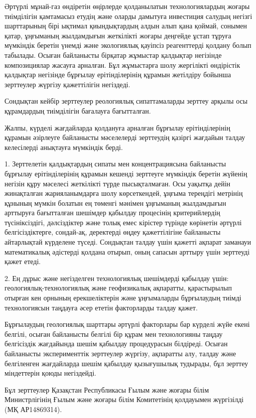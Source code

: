 \begin{multicols}{2}
Әртүрлі мұнай-газ өндіретін өңірлерде қолданылатын технологиялардың
жоғары тиімділігін қамтамасыз етудің және оларды дамытуға инвестиция
салудың негізгі шарттарының бірі ықтимал қиындықтардың алдын алып қана
қоймай, сонымен қатар, ұңғыманың жылдамдығын жеткілікті жоғары деңгейде
ұстап тұруға мүмкіндік беретін үнемді және экологиялық қауіпсіз
реагенттерді қолдану болып табылады. Осыған байланысты бірқатар жұмыстар
қалдықтар негізінде композициялар жасауға арналған. Бұл жұмыстарға шолу
жергілікті өндірістік қалдықтар негізінде бұрғылау ерітінділерінің
құрамын жетілдіру бойынша зерттеулер жүргізу қажеттілігін негіздеді.

Сондықтан кейбір зерттеулер реологиялық сипаттамаларды зерттеу арқылы
осы құрамдардың тиімділігін бағалауға бағытталған.

Жалпы, күрделі жағдайларда қолдануға арналған бұрғылау ерітінділерінің
құрамын әзірлеуге байланысты мәселелерді зерттеудің қазіргі жағдайын
талдау келесілерді анықтауға мүмкіндік берді.

1. Зерттелетін қалдықтардың сипаты мен концентрациясына байланысты
бұрғылау ерітінділерінің құрамын кешенді зерттеуге мүмкіндік беретін
жүйенің негізін құру мәселесі жеткілікті түрде пысықталмаған. Осы
уақытқа дейін жинақталған жарияланымдарға шолу көрсеткендей, ұңғыма
тереңдігі метрінің құнының мүмкін болатын ең төменгі мәнімен ұңғыманың
жылдамдығын арттыруға бағытталған шешімдер қабылдау процесінің
критерийлердің түсініксіздігі, дәлсіздіктер және толық емес кірістер
түрінде көрінетін әртүрлі белгісіздіктерге, сондай-ақ, деректерді өңдеу
қажеттілігіне байланысты айтарлықтай күрделене түседі. Сондықтан талдау
үшін қажетті ақпарат заманауи математикалық әдістерді қолдана отырып,
оның сапасын арттыру үшін зерттеуді қажет етеді.

2. Ең дұрыс және негізделген технологиялық шешімдерді қабылдау үшін:
геологиялық-технологиялық және геофизикалық ақпаратты, қарастырылып
отырған кен орнының ерекшеліктерін және ұңғымаларды бұрғылаудың тиімді
технологиясын таңдауға әсер ететін факторларды талдау қажет.

Бұрғылаудың геологиялық шарттары әртүрлі факторлары бар күрделі жүйе
екені белгілі, осыған байланысты белгілі бір құрам мен технологияны
таңдау белгісіздік жағдайында шешім қабылдау процедурасын білдіреді.
Осыған байланысты эксперименттік зерттеулер жүргізу, ақпаратты алу,
талдау және белгіленген жағдайларда шешім қабылдау қызығушылық тудырады,
бұл зерттеу міндеттерін қоюды негіздейді.

Бұл зерттеулер Қазақстан Республикасы Ғылым және жоғары білім
Министрлігінің Ғылым және жоғары білім Комитетінің қолдауымен жүргізілді
(МҚ АР14869314).
\end{multicols}

